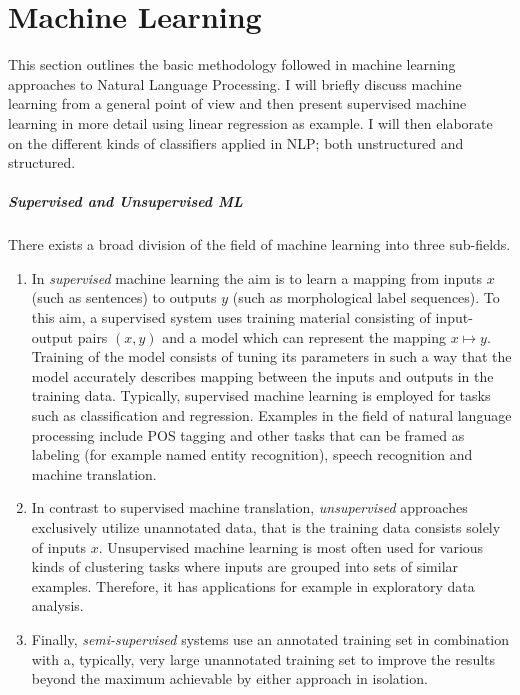 \chapter{Machine Learning}
\label{chap:ml}

This section outlines the basic methodology followed in machine
learning approaches to Natural Language Processing. I will briefly
discuss machine learning from a general point of view and then present
supervised machine learning in more detail using linear regression as
example. I will then elaborate on the different kinds of classifiers
applied in NLP; both unstructured and structured.

\paragraph{Supervised and Unsupervised ML} There exists a broad
division of the field of machine learning into three sub-fields.
\begin{enumerate}
\item In {\it supervised} machine learning the aim is to learn a mapping
  from inputs $x$ (such as sentences) to outputs $y$ (such as
  morphological label sequences). To this aim, a supervised system
  uses training material consisting of input-output pairs $(x,y)$ and
  a model which can represent the mapping $x \mapsto y$. Training of
  the model consists of tuning its parameters in such a way that the
  model accurately describes mapping between the inputs and outputs in
  the training data. Typically, supervised machine learning is
  employed for tasks such as classification and regression. Examples
  in the field of natural language processing include POS tagging and
  other tasks that can be framed as labeling (for example named entity
  recognition), speech recognition and machine translation.
\item In contrast to supervised machine translation, {\it unsupervised}
  approaches exclusively utilize unannotated data, that is the
  training data consists solely of inputs $x$. Unsupervised machine
  learning is most often used for various kinds of clustering tasks
  where inputs are grouped into sets of similar examples. Therefore,
  it has applications for example in exploratory data analysis.
\item Finally, {\it semi-supervised}
  systems use an annotated training set in combination with a,
  typically, very large unannotated training set to improve the
  results beyond the maximum achievable by either approach in
  isolation.
\end{enumerate}

